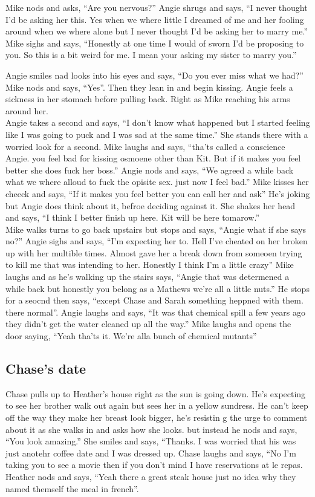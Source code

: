 \documentclass {article}[12pt]
\begin{document}
	Mike nods and asks, ``Are you nervous?'' Angie shrugs and says, ``I never thought I'd be asking her this. Yes when we where little I dreamed of me and her fooling around when we where alone but I never thought I'd be asking her to marry me.'' Mike sighs and says, ``Honestly at one time I would of sworn I'd be proposing to you. So this is a bit weird for me. I mean your asking my sister to marry you.'' 	\

	Angie smiles nad looks into his eyes and says, ``Do you ever miss what we had?'' Mike nods and says, ``Yes''. Then they lean in and begin kissing. Angie feels a sickness in her stomach before pulling back. Right as Mike reaching his arms around her. \\

	Angie takes a second and says, ``I don't know what happened but I started feeling like I was going to puck and I was sad at the same time.'' She stands there with a worried look for a second. Mike laughs and says, ``tha'ts called a conscience Angie. you feel bad for kissing osmoene other than Kit. But if it makes you feel better she does fuck her boss.'' Angie nods and says, ``We agreed a while back what we where alloud to fuck the opisite sex. just now I feel bad.'' Mike kisses her cheeck and says, ``If it makes you feel better you can call her and ask'' He's joking but Angie does think about it, befroe deciding against it. She shakes her head and says, ``I think I better finish up here. Kit will be here tomarow.''\\

	Mike walks turns to go back upstairs but stops and says, ``Angie what if she says no?'' Angie sighs and says, ``I'm expecting her to. Hell I've cheated on her broken up with her multible times. Almost gave her a break down from someoen trying to kill me that was intending to her. Honestly I think I'm a little crazy'' Mike laughs and  as he's walking up the stairs says, ``Angie that was determened a while back but honestly you belong as a Mathews we're all a little nuts.'' He stops for a seocnd then says, ``except Chase and Sarah something heppned with them. there normal''. Angie laughs and says, ``It was that chemical spill a few years ago they didn't get the water cleaned up all the way.'' Mike laughs and opens the door saying, ``Yeah tha'ts it. We're alla bunch of chemical mutants''
	
\subsection* {Chase's date}
	Chase pulls up to Heather's house right as the sun is going down. He's expecting to see her brother walk out again but sees her in a yellow sundress. He can't keep off the way they make her breast look bigger, he's resistin g the urge to comment about it as she walks in and asks how she looks. but instead he nods and says, ``You look amazing.''  She smiles and says, ``Thanks. I was worried that his was just anotehr coffee date and I was dressed up. Chase laughs and says, ``No I'm taking you to see a movie then if you don't mind I have reservations at le repas. Heather nods and says, ``Yeah there a great steak house just no idea why they named themself the meal in french''. \\
	
\end{document}
